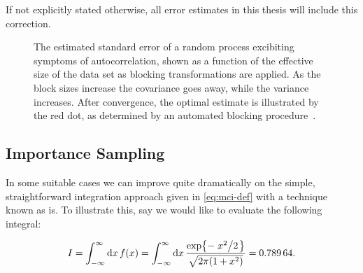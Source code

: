 \documentclass[Thesis.tex]{subfiles}
\begin{document}
If not explicitly stated otherwise, all error estimates in this thesis will
include this correction.


\begin{figure}[h]
  \centering
  \resizebox{0.7\linewidth}{!}{%
    
  }
  \caption[Standard error as a function of blocking transformations]{The estimated standard error of a random process excibiting symptoms
    of autocorrelation, shown as a function of the effective size of the data set as
    blocking transformations are applied. As the block sizes increase the
    covariance goes away, while the variance increases. After convergence, the
    optimal estimate is illustrated by the red dot, as determined by an automated blocking
    procedure~\cite{Jonsson-2018}.}
  \label{fig:blocking-example-diagram}
\end{figure}



\subsection{Importance Sampling}

In some suitable cases we can improve quite dramatically on the simple,
straightforward integration approach given in \cref{eq:mci-def} with a technique
known as \gls{is}. To illustrate this, say we
would like to evaluate the following integral:

\begin{align}
    \label{eq:mci-importance-example-func}
    I = \intfy\dd{x}f(x)=\intfy\dd{x} \frac{\exp{-\flatfrac{x^2}{2} }}{\sqrt{2\pi \qty(1 +x^2)}}  = \num{0.78964}.
\end{align}
\end{document}
